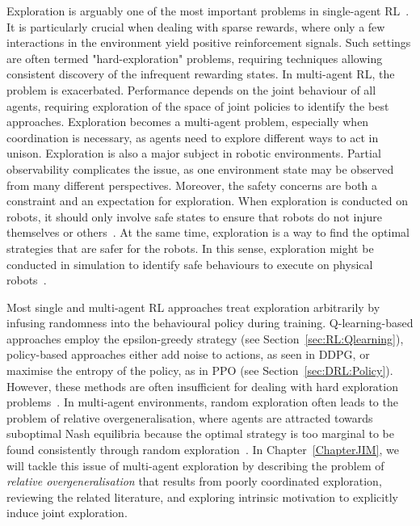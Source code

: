 Exploration is arguably one of the most important problems in single-agent RL~\citep{Hao2024_ExploReview}. It is particularly crucial when dealing with sparse rewards, where only a few interactions in the environment yield positive reinforcement signals. Such settings are often termed "hard-exploration" problems, requiring techniques allowing consistent discovery of the infrequent rewarding states.
In multi-agent RL, the problem is exacerbated. Performance depends on the joint behaviour of all agents, requiring exploration of the space of joint policies to identify the best approaches. Exploration becomes a multi-agent problem, especially when coordination is necessary, as agents need to explore different ways to act in unison. 
Exploration is also a major subject in robotic environments. Partial observability complicates the issue, as one environment state may be observed from many different perspectives. Moreover, the safety concerns are both a constraint and an expectation for exploration. When exploration is conducted on robots, it should only involve safe states to ensure that robots do not injure themselves or others~\citep{Koller2018_MBCSafeExp, Ding2021_SafeExp}. At the same time, exploration is a way to find the optimal strategies that are safer for the robots. In this sense, exploration might be conducted in simulation to identify safe behaviours to execute on physical robots~\citep{Garcia2015_SafeRL, Brunke2022_SafeLearningRobots}. 

Most single and multi-agent RL approaches treat exploration arbitrarily by infusing randomness into the behavioural policy during training. Q-learning-based approaches employ the epsilon-greedy strategy (see Section~\ref{sec:RL:Qlearning}), policy-based approaches either add noise to actions, as seen in DDPG, or maximise the entropy of the policy, as in PPO (see Section~\ref{sec:DRL:Policy}). However, these methods are often insufficient for dealing with hard exploration problems~\citep{Ostrovski2017_PseudoCounts, Pathak2017_ICM, Burda2019_RND}. In multi-agent environments, random exploration often leads to the problem of relative overgeneralisation, where agents are attracted towards suboptimal Nash equilibria because the optimal strategy is too marginal to be found consistently through random exploration~\citep{Wiegand2003_RelOvergen}. 
In Chapter~\ref{ChapterJIM}, we will tackle this issue of multi-agent exploration by describing the problem of \textit{relative overgeneralisation} that results from poorly coordinated exploration, reviewing the related literature, and exploring intrinsic motivation to explicitly induce joint exploration. 




